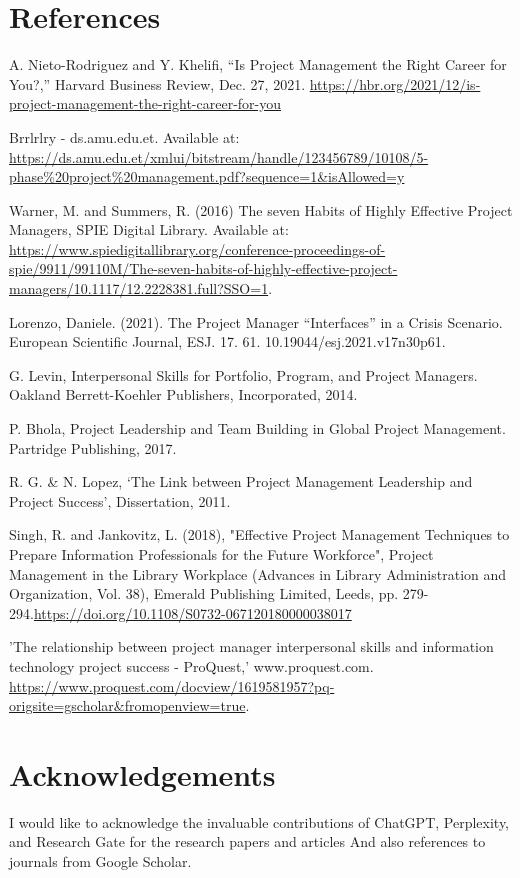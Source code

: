 \documentclass{article}
\begin{document}
\section*{References}
\vspace*{-35pt}
\renewcommand{\refname}{}
\begin{thebibliography}{99}
A. Nieto-Rodriguez and Y. Khelifi, “Is Project Management the Right Career for You?,” Harvard Business Review, Dec. 27, 2021. \url{https://hbr.org/2021/12/is-project-management-the-right-career-for-you}

Brrlrlry - ds.amu.edu.et. Available at: 
\url{https://ds.amu.edu.et/xmlui/bitstream/handle/123456789/10108/5-phase%20project%20management.pdf?sequence=1&isAllowed=y}

Warner, M. and Summers, R. (2016) The seven Habits of Highly Effective Project Managers, SPIE Digital Library. Available at: \url{https://www.spiedigitallibrary.org/conference-proceedings-of-spie/9911/99110M/The-seven-habits-of-highly-effective-project-managers/10.1117/12.2228381.full?SSO=1}. 

Lorenzo, Daniele. (2021). The Project Manager “Interfaces” in a Crisis Scenario. European Scientific Journal, ESJ. 17. 61. 10.19044/esj.2021.v17n30p61. 


G. Levin, Interpersonal Skills for Portfolio, Program, and Project Managers. Oakland Berrett-Koehler Publishers, Incorporated, 2014.


P. Bhola, Project Leadership and Team Building in Global Project Management. Partridge Publishing, 2017.


R. G. \& N. Lopez, ‘The Link between Project Management Leadership and Project Success’, Dissertation, 2011.


Singh, R. and Jankovitz, L. (2018), "Effective Project Management Techniques to Prepare Information Professionals for the Future Workforce", Project Management in the Library Workplace (Advances in Library Administration and Organization, Vol. 38), Emerald Publishing Limited, Leeds, pp. 279-294.\url{https://doi.org/10.1108/S0732-067120180000038017}


'The relationship between project manager interpersonal skills and information technology project success - ProQuest,' www.proquest.com. \url{https://www.proquest.com/docview/1619581957?pq-origsite=gscholar&fromopenview=true}.


\end{thebibliography}

\newpage

\section{Acknowledgements}
I would like to acknowledge the invaluable contributions of ChatGPT, Perplexity, and Research Gate for the research papers and articles And also references to journals from Google Scholar.
\end{document}
